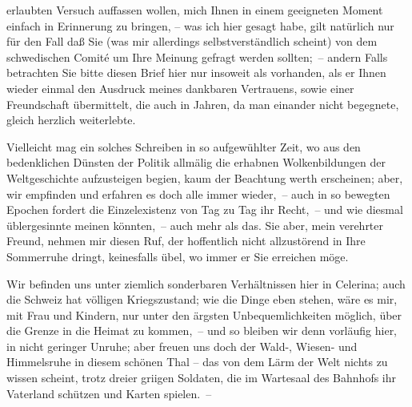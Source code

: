                erlaubten Versuch auffassen wollen, mich Ihnen in einem geeigneten Moment einfach in
               Erinnerung zu bringen, {\pb}– was ich hier gesagt
               habe, gilt natürlich nur für den Fall daß Sie (was mir allerdings selbstverständlich
               scheint) von dem schwedischen Comité um Ihre Meinung gefragt werden sollten; – andern
               Falls betrachten Sie bitte diesen Brief hier nur insoweit als vorhanden, als er Ihnen
               wieder einmal den Ausdruck meines dankbaren Vertrauens, sowie einer Freundschaft
               übermittelt, die auch in  Jahren, da man einander
               nicht begegnete, gleich herzlich weiterlebte.\pend
           
\pstart
           Vielleicht mag ein solches Schreiben in so aufgewühlter Zeit, wo aus den bedenklichen
               Dünsten der Politik allmälig die erhabnen Wolkenbildun{\pb}gen der Weltgeschichte aufzusteigen begi{\geminationn}en, kaum der Beachtung werth erscheinen; aber, wir
               empfinden und erfahren es doch alle immer wieder, – auch in so bewegten Epochen
               fordert die Einzelexistenz von Tag zu Tag ihr Recht, – und wie diesmal üblergesinnte
               meinen könnten, – auch mehr als das. Sie aber, mein verehrter Freund, nehmen mir
               diesen Ruf, der hoffentlich nicht allzustörend in Ihre Sommerruhe dringt, keinesfalls
               übel, wo immer er Sie erreichen möge.\pend
           
\pstart
           Wir befinden uns unter ziemlich sonderbaren Verhältnissen hier in Celerina; auch die Schweiz
               hat völligen Kriegszustand; wie die Dinge eben stehen, wäre es mir, mit Frau und Kindern, nur unter den ärgsten {\pb}Unbequemlichkeiten möglich, über die Grenze in die
               Heimat zu kommen, – und so bleiben wir denn vorläufig \introOben{}hier\introOben{},
               in nicht geringer Unruhe; aber freuen uns doch der Wald-, Wiesen- und Himmelsruhe in
               diesem schönen Thal – das von dem Lärm der Welt nichts zu wissen scheint, trotz
               dreier gri{\geminationm}igen Soldaten, die im Wartesaal des Bahnhofs
               ihr Vaterland schützen und Karten spielen. –\pend
           
